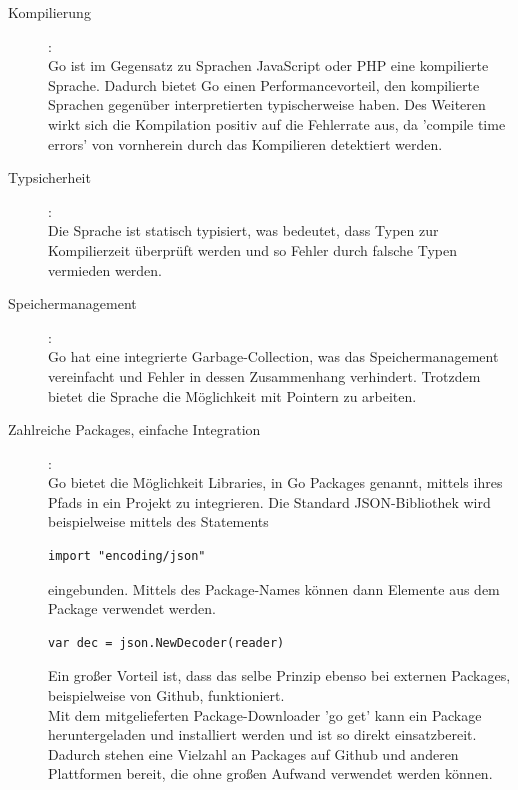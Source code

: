 \documentclass[a4paper,10pt]{scrartcl}
\begin{document}
\begin{description}
\item[Kompilierung]:\\

Go ist im Gegensatz zu Sprachen JavaScript oder PHP eine kompilierte Sprache. Dadurch bietet Go einen Performancevorteil, den kompilierte Sprachen gegenüber interpretierten typischerweise haben. Des Weiteren wirkt sich die Kompilation positiv auf die Fehlerrate aus, da 'compile time errors' von vornherein durch das Kompilieren detektiert werden.\\

\item[Typsicherheit]:\\

Die Sprache ist statisch typisiert, was bedeutet, dass Typen zur Kompilierzeit überprüft werden und so Fehler durch falsche Typen vermieden werden. 

\item[Speichermanagement]:\\

Go hat eine integrierte Garbage-Collection, was das Speichermanagement vereinfacht und Fehler in dessen Zusammenhang verhindert. Trotzdem bietet die Sprache die Möglichkeit mit Pointern zu arbeiten.


\item[Zahlreiche Packages, einfache Integration]:\\

Go bietet die Möglichkeit Libraries, in Go Packages genannt, mittels ihres Pfads in ein Projekt zu integrieren. Die Standard JSON-Bibliothek wird beispielweise mittels des Statements 

\begin{lstlisting}
import "encoding/json"
\end{lstlisting}

eingebunden. Mittels des Package-Names können dann Elemente aus dem Package verwendet werden.


\begin{lstlisting}
var dec = json.NewDecoder(reader)
\end{lstlisting}

Ein großer Vorteil ist, dass das selbe Prinzip ebenso bei externen Packages, beispielweise von Github, funktioniert.\\
Mit dem mitgelieferten Package-Downloader 'go get' kann ein Package heruntergeladen und installiert werden und ist so direkt einsatzbereit. Dadurch stehen eine Vielzahl an Packages auf Github und anderen Plattformen bereit, die ohne großen Aufwand verwendet werden können.


\end{description}
\end{document}

